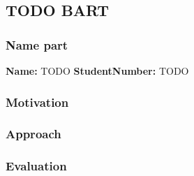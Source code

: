 \subsection{TODO BART}
\subsubsection*{Name part}
\textbf{Name:} TODO \indent \textbf{StudentNumber:} TODO

\subsubsection*{Motivation}

\subsubsection*{Approach}

\subsubsection*{Evaluation }